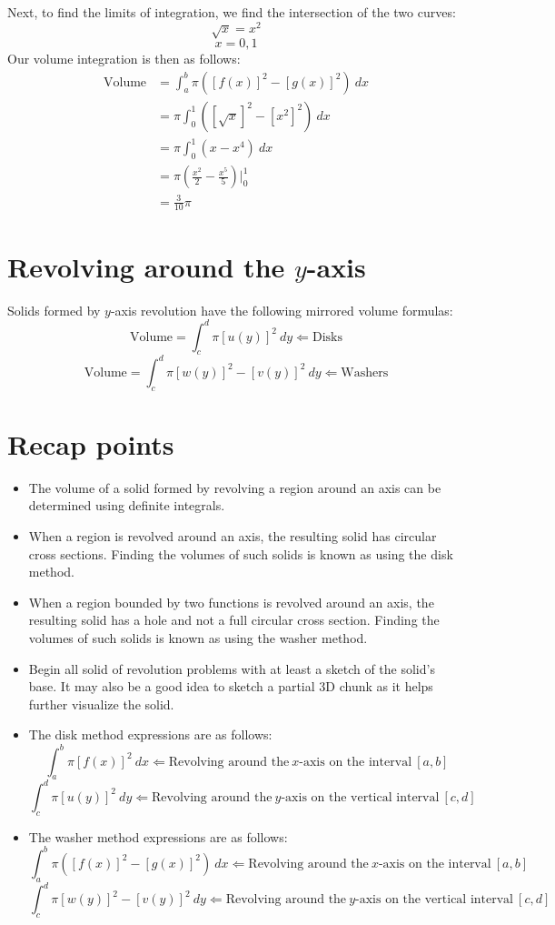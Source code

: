 \documentclass[11pt]{scrartcl}
\begin{document}
\noindent 
Next, to find the limits of integration, we find the intersection of the two curves: 
$$\sqrt{x}=x^2$$
$$x=0,1$$
\noindent
Our volume integration is then as follows: 
\begin{align*}
    \text{Volume} &=\int_a^b{\pi([f(x)]^2-[g(x)]^2) \ dx} \\
    &=\pi \int_0^1{([\sqrt{x}]^2-[x^2]^2) \ dx} \\
    &=\pi \int_0^1{(x-x^4) \ dx} \\
    &=\pi \left(\frac{x^2}{2}-\frac{x^5}{5}\right) \biggr \rvert_0^1 \\
    &=\frac{3}{10}\pi
\end{align*}
\section{Revolving around the $y$-axis}
\noindent 
Solids formed by $y$-axis revolution have the following mirrored volume formulas: 
$$\text{Volume}=\int_c^d{\pi[u(y)]^2 \ dy} \Leftarrow \text{Disks}$$
$$\text{Volume}=\int_c^d{\pi[w(y)]^2-[v(y)]^2 \ dy} \Leftarrow \text{Washers}$$
\noindent 
\section{Recap points}
\begin{itemize}
    \item The volume of a solid formed by revolving a region around an axis can be determined using definite integrals. 
    \item When a region is revolved around an axis, the resulting solid has circular cross sections. Finding the volumes of such solids is known as using the disk method.
    \item When a region bounded by two functions is revolved around an axis, the resulting solid has a hole and not a full circular cross section. Finding the volumes of such solids is known as using the washer method. 
    \item Begin all solid of revolution problems with at least a sketch of the solid's base. It may also be a good idea to sketch a partial 3D chunk as it helps further visualize the solid. 
    \item The disk method expressions are as follows: 
    $$\int_a^b{\pi[f(x)]^2} \ dx\Leftarrow \text{Revolving around the} \ x \text{-axis on the interval} \ [a,b]$$
    $$\int_c^d{\pi[u(y)]^2 \ dy}\Leftarrow \text{Revolving around the} \ y\text{-axis on the vertical interval} \  [c,d]$$
    \item The washer method expressions are as follows: 
    $$\int_a^b{\pi([f(x)]^2-[g(x)]^2) \ dx} \Leftarrow \text{Revolving around the} \ x\text{-axis on the interval} \ [a,b]$$
    $$\int_c^d{\pi[w(y)]^2-[v(y)]^2 \ dy} \Leftarrow \text{Revolving around the} \ y\text{-axis on the vertical interval} \ [c,d]$$
    
\end{itemize}
\end{document}
